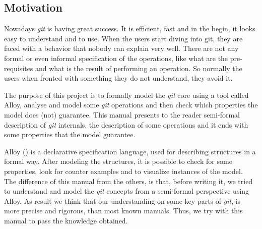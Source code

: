 \subsection{Motivation}
Nowadays \emph{git} is having great success. It is efficient, fast and
in the begin, it looks easy to understand and to use. When
the users start diving into git, they are faced with a behavior that
nobody can explain very well. There are not any formal or even informal
specification of the operations, like what are the pre-requisites and
what is the result of performing an operation. So normally the users
when fronted with something they do not understand, they avoid it.\par
The purpose of this project is to
formally model the \emph{git} core using a tool called 
Alloy, analyse and model some \emph{git}
operations and then check which properties the model does (not)
guarantee. This manual presents to the reader semi-formal description of
\emph{git} internals, the description of some operations and it ends with
some properties that the model guarantee.\par
Alloy (\cite{Jackson:2006:SAL:1146359}) is a declarative specification language, used for describing structures in 
a formal way. After modeling the structures, it is possible to
check for some properties, look for counter examples and to visualize 
instances of the model. \\

The difference of this manual from the others, is
that, before writing it, we tried to understand and model 
the \emph{git} concepts from a semi-formal perspective using Alloy. As result 
we think that our understanding on some key parts of \emph{git}, is more precise
and rigorous, than most known manuals. Thus, we try with this manual
to pass the knowledge obtained. \par 


